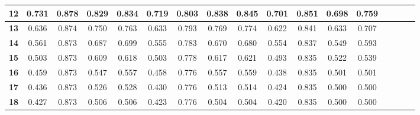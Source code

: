 \begin{table*}[!t]
\begin{tabular}{|c|c|c|c|c|c|c|c|c|c|c|c|c|c|c|c|c|}
\hline\bfseries 12 & 0.731 & 0.878 & 0.829 & 0.834 & 0.719 & 0.803 & 0.838 & 0.845 & 0.701 & 0.851 & 0.698 & 0.759 \\
\hline\bfseries 13 & 0.636 & 0.874 & 0.750 & 0.763 & 0.633 & 0.793 & 0.769 & 0.774 & 0.622 & 0.841 & 0.633 & 0.707 \\
\hline\bfseries 14 & 0.561 & 0.873 & 0.687 & 0.699 & 0.555 & 0.783 & 0.670 & 0.680 & 0.554 & 0.837 & 0.549 & 0.593 \\
\hline\bfseries 15 & 0.503 & 0.873 & 0.609 & 0.618 & 0.503 & 0.778 & 0.617 & 0.621 & 0.493 & 0.835 & 0.522 & 0.539 \\
\hline\bfseries 16 & 0.459 & 0.873 & 0.547 & 0.557 & 0.458 & 0.776 & 0.557 & 0.559 & 0.438 & 0.835 & 0.501 & 0.501 \\
\hline\bfseries 17 & 0.436 & 0.873 & 0.526 & 0.528 & 0.430 & 0.776 & 0.513 & 0.514 & 0.424 & 0.835 & 0.500 & 0.500 \\
\hline\bfseries 18 & 0.427 & 0.873 & 0.506 & 0.506 & 0.423 & 0.776 & 0.504 & 0.504 & 0.420 & 0.835 & 0.500 & 0.500 \\
\hline
\end{tabular}
\end{table*}

